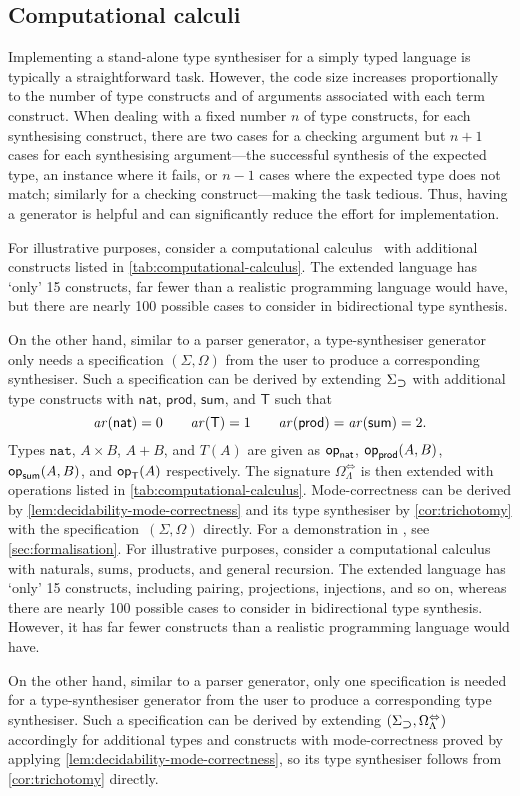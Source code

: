 \subsection{Computational calculi}\label{subsec:PCF}
Implementing a stand-alone type synthesiser for a simply typed language is typically a straightforward task.
However, the code size increases proportionally to the number of type constructs and of arguments associated with each term construct.
When dealing with a fixed number $n$ of type constructs, for each synthesising construct, there are two cases for a checking argument but $n + 1$ cases for each synthesising argument---the successful synthesis of the expected type, an instance where it fails, or $n-1$ cases where the expected type does not match; similarly for a checking construct---making the task tedious.
Thus, having a generator is helpful and can significantly reduce the effort for implementation.

\ifarxiv
For illustrative purposes, consider a computational calculus~\cite{Moggi1989} with additional constructs listed in \cref{tab:computational-calculus}.
The extended language has `only' 15 constructs, far fewer than a realistic programming language would have, but there are nearly 100 possible cases to consider in bidirectional type synthesis.

On the other hand, similar to a parser generator, a type-synthesiser generator only needs a specification $(\Sigma, \Omega)$ from the user to produce a corresponding synthesiser. 
Such a specification can be derived by extending $\Sigma_{\mathbin{\bm{\supset}}}$ with additional type constructs with $\mathsf{nat}$, $\mathsf{prod}$, $\mathsf{sum}$, and $\mathsf{T}$ such that
\[
  \mathit{ar}({\mathsf{nat}}) = 0\qquad
  \mathit{ar}({\mathsf{T}}) = 1\qquad
  \mathit{ar}({\mathsf{prod}}) = \mathit{ar}({\mathsf{sum}}) = 2.
\]
Types $\mathtt{nat}$, $A \times B$, $A + B$, and $T(A)$ are given as $\mathsf{op}_{\mathsf{nat}}$, $\mathsf{op}_{\mathsf{prod}}(A, B)$, $\mathsf{op}_{\mathsf{sum}}(A, B)$, and $\mathsf{op}_{\mathsf{T}}(A)$ respectively.
The signature $\Omega_{\Lambda}^{\Leftrightarrow}$ is then extended with operations listed in \cref{tab:computational-calculus}.
Mode-correctness can be derived by \cref{lem:decidability-mode-correctness} and its type synthesiser by \cref{cor:trichotomy} with the specification~$(\Sigma, \Omega)$ directly.
For a demonstration in \Agda, see \cref{sec:formalisation}.
\else
For illustrative purposes, consider a computational calculus~\cite{Moggi1989} with naturals, sums, products, and general recursion.
The extended language has `only' 15 constructs, including pairing, projections, injections, and so on, whereas there are nearly 100 possible cases to consider in bidirectional type synthesis.
However, it has far fewer constructs than a realistic programming language would have. 

On the other hand, similar to a parser generator, only one specification is needed for a type-synthesiser generator from the user to produce a corresponding type synthesiser. 
Such a specification can be derived by extending $(\Sigma_{\mathbin{\bm{\supset}}}, \Omega_{\Lambda}^{\Leftrightarrow})$ accordingly for additional types and constructs with mode-correctness proved by applying \cref{lem:decidability-mode-correctness}, so its type synthesiser follows from \cref{cor:trichotomy} directly.
\fi
